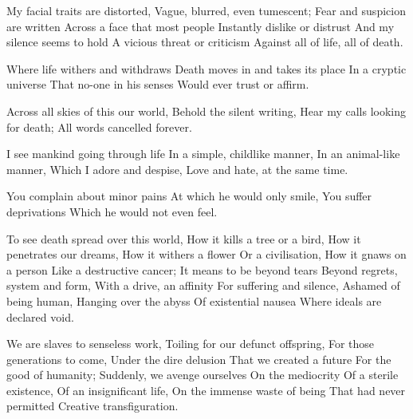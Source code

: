 \documentclass{article}
\newenvironment{stanza}{\begin{minipage}{10cm}\begin{internallinenumbers}\obeylines}{\end{internallinenumbers}\end{minipage}\vspace{\baselineskip}}
\begin{document}
\begin{stanza}
My facial traits are distorted,
Vague, blurred, even tumescent;
Fear and suspicion are written
Across a face that most people
Instantly dislike or distrust
And my silence seems to hold
A vicious threat or criticism
Against all of life, all of death.
\end{stanza}

\begin{stanza}
Where life withers and withdraws
Death moves in and takes its place
In a cryptic universe
That no-one in his senses
Would ever trust or affirm.
\end{stanza}

\begin{stanza}
Across all skies of this our world,
Behold the silent writing,
Hear my calls looking for death;
All words cancelled forever.
\end{stanza}


\begin{stanza}
I see mankind going through life
In a simple, childlike manner,
In an animal-like manner,
Which I adore and despise,
Love and hate, at the same time.
\end{stanza}

\begin{stanza}
You complain about minor pains
At which he would only smile,
You suffer deprivations
Which he would not even feel.
\end{stanza}


\begin{stanza}
To see death spread over this world,
How it kills a tree or a bird,
How it penetrates our dreams,
How it withers a flower
Or a civilisation,
How it gnaws on a person
Like a destructive cancer;
It means to be beyond tears
Beyond regrets, system and form,
With a drive, an affinity
For suffering and silence,
Ashamed of being human,
Hanging over the abyss
Of existential nausea
Where ideals are declared void.
\end{stanza}

\begin{stanza}
We are slaves to senseless work,
Toiling for our defunct offspring,
For those generations to come,
Under the dire delusion
That we created a future
For the good of humanity;
Suddenly, we avenge ourselves
On the mediocrity
Of a sterile existence,
Of an insignificant life,
On the immense waste of being
That had never permitted
Creative transfiguration.
\end{stanza}
\end{document}
